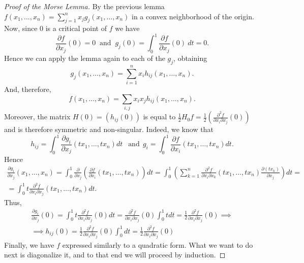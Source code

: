 \begin{proof}[Proof of the Morse Lemma]
    By the previous lemma $f(x_1,\dots,x_n)=\sum_{j=1}^n x_jg_j(x_1,\dots,x_n)$ in a convex neighborhood of the origin. Now, since $0$ is a critical point of $f$ we have
    \begin{equation*}
        \frac{\partial f}{\partial x_j}(0)=0 ~\text{ and }~ g_j(0)=\int_0^1 \frac{\partial f}{\partial x_j}(0)~dt=0.
    \end{equation*}
    Hence we can apply the lemma again to each of the $g_j$, obtaining
    \begin{equation*}
        g_j(x_1,\dots,x_n)=\sum_{i=1}^n x_ih_{ij}(x_1,\dots,x_n).
    \end{equation*}
    And, therefore,
    \begin{equation*}
        f(x_1,\dots,x_n)=\sum_{i,j} x_ix_jh_{ij}(x_1,\dots,x_n).
    \end{equation*}
    Moreover, the matrix $H(0)=(h_{ij}(0))$ is equal to $\frac{1}{2}H_0f=\frac{1}{2}(\frac{\partial^2f}{\partial x_i\partial x_j}(0))$ and is therefore symmetric and non-singular. Indeed, we know that
    \begin{equation*}
        h_{ij}=\int_0^1 \frac{\partial g_i}{\partial x_j}(tx_1,\dots,tx_n)dt ~~\text{ and}~~ g_{i}=\int_0^1 \frac{\partial f}{\partial x_i}(tx_1,\dots,tx_n)dt.
    \end{equation*}
    Hence
    \begin{gather*}
        \frac{\partial g_i}{\partial x_j}(x_1,\dots,x_n)= \int_0^1 \frac{\partial}{\partial x_j}\left(\frac{\partial f}{\partial x_i}(tx_1,\dots,tx_n)\right)dt = \int_0^1 \left(\sum_{k=1}^n\frac{\partial^2 f}{\partial x_i \partial x_k}(tx_1,\dots,tx_n) \frac{\partial(tx_k)}{\partial x_j}\right)dt =\\
        = \int_0^1t\frac{\partial^2 f}{\partial x_i \partial x_j}(tx_1,\dots,tx_n)dt.
    \end{gather*}
    Thus,
    \begin{gather*}
        \frac{\partial g_i}{\partial x_j}(0)=\int_0^1 t\frac{\partial^2 f}{\partial x_i \partial x_j}(0)dt=\frac{\partial^2 f}{\partial x_i \partial x_j}(0)\int_0^1tdt= \frac{1}{2}\frac{\partial^2 f}{\partial x_i \partial x_j}(0)\implies\\
        \implies h_{ij}(0)=\frac{1}{2}\frac{\partial^2 f}{\partial x_i \partial x_j}(0)\int_0^1 dt =\frac{1}{2}\frac{\partial^2 f}{\partial x_i \partial x_j}(0)
    \end{gather*}
    Finally, we have $f$ expressed similarly to a quadratic form. What we want to do next is diagonalize it, and to that end we will proceed by induction.


\end{proof}
